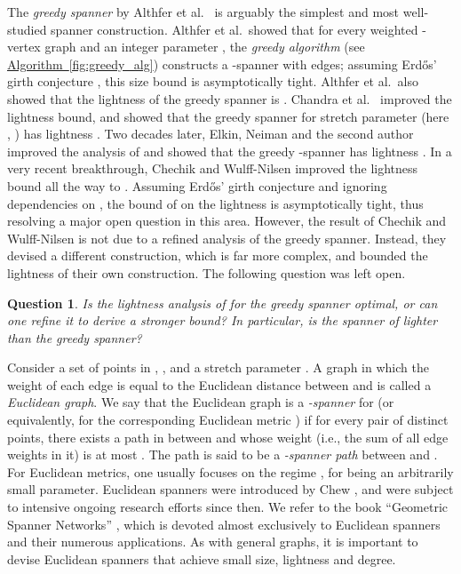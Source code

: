 \documentclass[11pt,letterpaper]{article}
\newtheorem{question}{Question}
\newcommand{\namedref}[2]{\hyperref[#2]{#1~\ref*{#2}}}
\newcommand{\algref}[1]{\namedref{Algorithm}{#1}}
\begin{document}
The \emph{greedy spanner} by Althfer  et al.\ \cite{ADDJS93} is arguably the simplest and most well-studied spanner construction.    			
Althfer  et al.\ showed that for every  weighted -vertex graph  and an integer parameter ,
the \emph{greedy algorithm} (see \algref{fig:greedy_alg}) constructs a -spanner with  edges;
assuming Erd\H{o}s' girth conjecture \cite{erd64}, this size bound is asymptotically tight.
Althfer  et al.\ also showed that the lightness of the greedy spanner is .
Chandra et al.\ \cite{CDNS92} improved the lightness bound, and showed that the greedy spanner for stretch parameter 
(here , ) has lightness .
Two decades later, Elkin, Neiman and the second author \cite{ENS14} improved the analysis of \cite{CDNS92} and showed that the greedy -spanner has lightness .
In a very recent breakthrough, Chechik and Wulff-Nilsen \cite{CW18} improved the lightness bound all the way to .
Assuming Erd\H{o}s' girth conjecture \cite{erd64} and ignoring dependencies on , the bound of \cite{CW18} on the lightness is asymptotically tight,
thus resolving a major open question in this area. However, the result of Chechik and Wulff-Nilsen \cite{CW18}
is not due to a refined analysis of the greedy spanner. Instead, they devised a different construction, which is far more complex, and
bounded the lightness of their own construction. The following question was left open.
\begin{question} \label{question1}
	Is the lightness analysis of \cite{ENS14} for the greedy spanner optimal, or can one refine it to derive a stronger bound?
	In particular, is the spanner of \cite{CW18} lighter than the greedy spanner?
\end{question}
\vspace{2pt}
Consider a set  of  points in , , and a stretch parameter .
A graph  in which the weight  of each edge 
is equal to the Euclidean distance  between  and  is called a \emph{Euclidean graph}.
We say that the Euclidean graph  is a \emph{-spanner} for  (or equivalently, for the corresponding Euclidean metric ) if for every pair  of distinct points, there exists a path  in 
between  and  whose weight (i.e., the sum of all edge weights in it) is at most .
The path  is said to be a \emph{-spanner path} between  and .
For Euclidean metrics, one usually focuses on the regime , for  being an arbitrarily small parameter.
Euclidean spanners were introduced by Chew \cite{Chew86}, and were subject to intensive ongoing research efforts since then.
We refer to the book ``Geometric Spanner Networks'' \cite{NS07}, which is devoted almost exclusively to Euclidean spanners and their numerous applications.
As with general graphs, it is important to devise Euclidean spanners that achieve small size, lightness and degree.
\end{document}
